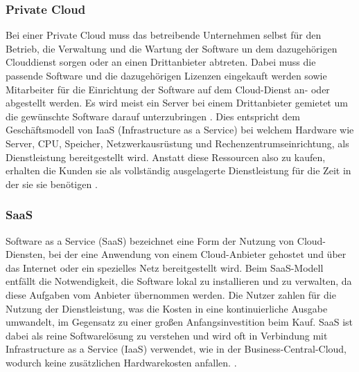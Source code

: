 \documentclass[12pt,bibtotoc]{article}
\begin{document}
		\subsubsection{Private Cloud}
		Bei einer Private Cloud muss das betreibende Unternehmen selbst für den Betrieb, die Verwaltung und die Wartung der Software un dem dazugehörigen Clouddienst sorgen oder an einen Drittanbieter abtreten.
		Dabei muss die passende Software und die dazugehörigen Lizenzen eingekauft werden sowie Mitarbeiter für die Einrichtung der Software auf dem Cloud-Dienst an- oder abgestellt werden.
		Es wird meist ein Server bei einem Drittanbieter gemietet um die gewünschte Software darauf unterzubringen \cite{Anhang}. \newline
		Dies entspricht dem Geschäftsmodell von IaaS (Infrastructure as a Service) bei welchem Hardware wie Server, CPU, Speicher, Netzwerkausrüstung und Rechenzentrumseinrichtung, als Dienstleistung bereitgestellt wird.
		Anstatt diese Ressourcen also zu kaufen, erhalten die Kunden sie als vollständig ausgelagerte Dienstleistung für die Zeit in der sie sie benötigen \cite{Murugesan.2016}.
		\subsubsection{SaaS}
		Software as a Service (SaaS) bezeichnet eine Form der Nutzung von Cloud-Diensten, bei der eine Anwendung von einem Cloud-Anbieter gehostet und über das Internet oder ein spezielles Netz bereitgestellt wird. Beim SaaS-Modell entfällt die Notwendigkeit, die Software lokal zu installieren und zu verwalten, da diese Aufgaben vom Anbieter übernommen werden. Die Nutzer zahlen für die Nutzung der Dienstleistung, was die Kosten in eine kontinuierliche Ausgabe umwandelt, im Gegensatz zu einer großen Anfangsinvestition beim Kauf. SaaS ist dabei als reine Softwarelösung zu verstehen und wird oft in Verbindung mit Infrastructure as a Service (IaaS) verwendet, wie in der Business-Central-Cloud, wodurch keine zusätzlichen Hardwarekosten anfallen. \cite{Murugesan.2016}\cite{Anhang}.
		
\end{document}

